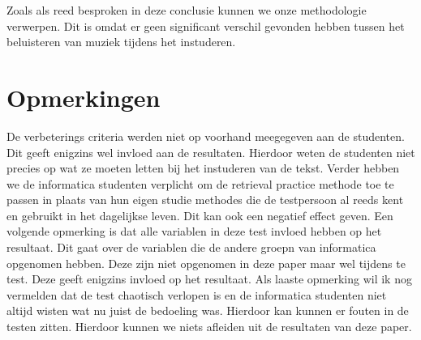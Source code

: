 \documentclass{hogent-article}
\begin{document}
	Zoals als reed besproken in deze conclusie kunnen we onze methodologie verwerpen. Dit is omdat er geen significant verschil gevonden hebben tussen het beluisteren van muziek tijdens het instuderen.
	
	
	\section{Opmerkingen}
	De verbeterings criteria werden niet op voorhand meegegeven aan de studenten. Dit geeft enigzins wel invloed aan de resultaten. Hierdoor weten de studenten niet precies op wat ze moeten letten bij het instuderen van de tekst.
	Verder hebben we de informatica studenten verplicht om de retrieval practice methode toe te passen in plaats van hun eigen studie methodes die de testpersoon al reeds kent en gebruikt in het dagelijkse leven. Dit kan ook een negatief effect geven.
	Een volgende opmerking is dat alle variablen in deze test invloed hebben op het resultaat. Dit gaat over de variablen die de andere groepn van informatica opgenomen hebben. Deze zijn niet opgenomen in deze paper maar wel tijdens te test. Deze geeft enigzins invloed op het resultaat.
	Als laaste opmerking wil ik nog vermelden dat de test chaotisch verlopen is en de informatica studenten niet altijd wisten wat nu juist de bedoeling was. Hierdoor kan kunnen er fouten in de testen zitten. 
	Hierdoor kunnen we niets afleiden uit de resultaten van deze paper.
	
	
	\printbibliography[heading=bibintoc]
	
\end{document}
